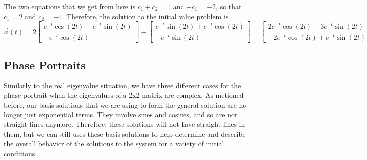 \begin{exampleSol}
The two equations that we get from here is $c_1 + c_2 = 1$ and $-c_1 = -2$, so that $c_1 = 2$ and $c_2 = -1$. Therefore, the solution to the initial value problem is
\begin{equation*}
\vec{x}(t) = 2\begin{bmatrix} e^{-t}\cos(2t) - e^{-t}\sin(2t) \\ -e^{-t}\cos(2t)\end{bmatrix} - \begin{bmatrix} e^{-t}\sin(2t) + e^{-t}\cos(2t) \\ -e^{-t}\sin(2t) \end{bmatrix} = \begin{bmatrix} 2e^{-t}\cos(2t) - 3e^{-t}\sin(2t) \\ -2e^{-t}\cos(2t) + e^{-t}\sin(2t) \end{bmatrix}.
\end{equation*}
\end{exampleSol}

\subsection{Phase Portraits}

Similarly to the real eigenvalue situation, we have three different cases for the phase portrait when the eigenvalues of a 2x2 matrix are complex. As metioned before, our basis solutions that we are using to form the general solution are no longer just exponential terms. They involve sines and cosines, and so are not straight lines anymore. Therefore, these solutions will not have straight lines in them, but we can still uses these basis solutions to help determine and describe the overall behavior of the solutions to the system for a variety of initial conditions. 

